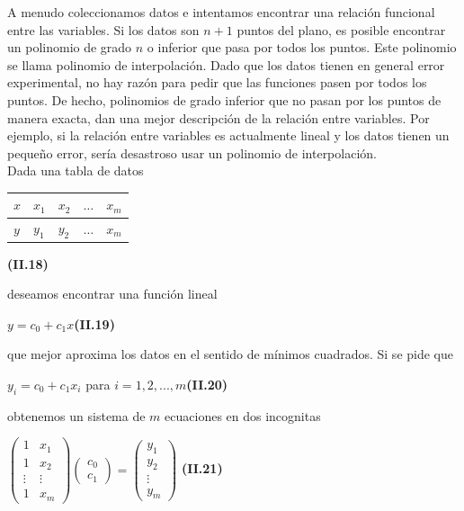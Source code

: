 \documentclass[twocolumn,twoside]{article}
\begin{document}
A menudo coleccionamos datos e 
intentamos encontrar una relaci\'on funcional entre las variables. Si los datos son $n+1$ 
puntos del plano, es posible encontrar un polinomio de grado $n$ o inferior que pasa por 
todos los puntos. Este polinomio se llama polinomio de interpolaci\'on.
Dado que los datos tienen en general error experimental,
no hay raz\'on para pedir que las funciones pasen por todos los puntos. De hecho, polinomios
de grado inferior que no pasan por los puntos de manera exacta, dan una mejor
descripci\'on de la relaci\'on entre variables. Por ejemplo, si la relaci\'on entre variables es
actualmente lineal y los datos tienen un peque\~no error, ser\'ia desastroso usar un polinomio
de interpolaci\'on.\\
Dada una tabla de datos \\
    \begin{table}[!htb]
    \begin{center}
        
    
    \begin{tabular}{|l|l|l|l|l|}
    \hline
    
    $x$&   $x_{1}$&   $x_{2}$&   $\dots$&  $x_{m}$ \\ \hline
    $y$&   $y_{1}$&   $y_{2}$&   $\dots$&  $x_{m}$ \\ 
    \hline 
    \end{tabular}
    \hspace{1cm}\textbf{(II.18)}
    \end{center}
    \end{table} 

deseamos encontrar una funci\'on lineal
\begin{center}
  $y = c_0 + c_1 x $\hspace{2cm}\textbf{(II.19)}

\end{center}
que mejor aproxima los datos en el sentido de m\'inimos cuadrados. Si se pide que
\begin{center}
  $y_i = c_0 + c_1 x_i$ para $i = 1, 2, . . . , m$\hspace{0.5cm}\textbf{(II.20)}

\end{center}
obtenemos un sistema de $m$ ecuaciones en dos incognitas
\begin{center}
$ 
\left( \begin{array}{cc}
  1 & x_1\\ 
  1 & x_2  \\
  \vdots & \vdots  \\
  1 & x_m 
 \end{array} \right) 
 \left( \begin{array}{c}
  c_0\\ 
  c_1  
 \end{array} \right) =
 \left( \begin{array}{c}
  y_1\\ 
  y_2 \\
  \vdots \\
  y_m
 \end{array} \right)$
\hspace{0.25cm}\textbf{(II.21)}
\end{center}
\end{document}
